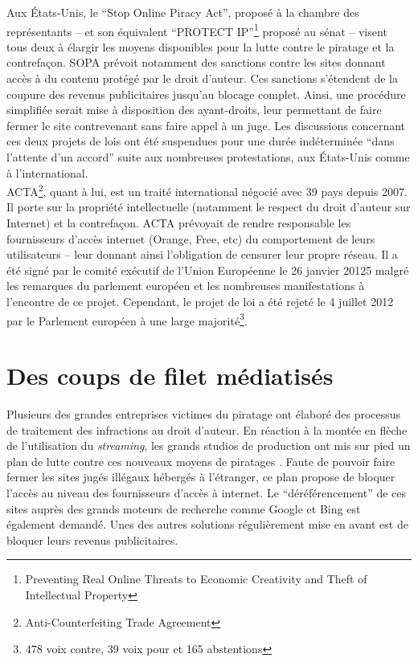 \documentclass[a4paper]{report}
\begin{document}
		Aux États-Unis, le ``Stop Online Piracy Act'', proposé à la chambre des représentants – et son équivalent ``PROTECT IP''\footnote{Preventing Real Online Threats to Economic Creativity and Theft of Intellectual Property} proposé au sénat – visent tous deux à élargir les moyens disponibles pour la lutte contre le piratage et la contrefaçon. SOPA prévoit notamment des sanctions contre les sites donnant accès à du contenu protégé par le droit d'auteur. Ces sanctions s'étendent de la coupure des revenus publicitaires jusqu'au blocage complet. Ainsi, une procédure simplifiée serait mise à disposition des ayant-droits, leur permettant de faire fermer le site contrevenant sans faire appel à un juge. Les discussions concernant ces deux projets de lois ont été suspendues pour une durée indéterminée ``dans l'attente d'un accord'' \cite{suspension-sopa} suite aux nombreuses protestations, aux États-Unis comme à l'international.\\

		ACTA\footnote{Anti-Counterfeiting Trade Agreement}, quant à lui, est un traité international négocié avec 39 pays \cite{no-to-acta} depuis 2007. Il porte sur la propriété intellectuelle (notamment le respect du droit d'auteur sur Internet) et la contrefaçon. ACTA prévoyait de rendre responsable les fournisseurs d'accès internet (Orange, Free, etc) du comportement de leurs utilisateurs – leur donnant ainsi l'obligation de censurer leur propre réseau. Il a été signé par le comité exécutif de l'Union Européenne le 26 janvier 20125 malgré les remarques du parlement européen et les nombreuses manifestations à l'encontre de ce projet. Cependant, le projet de loi a été rejeté le 4 juillet 2012 par le Parlement européen \cite{acta-vote} à une large majorité\footnote{478 voix contre, 39 voix pour et 165 abstentions}.


	\section{Des coups de filet médiatisés}
	Plusieurs des grandes entreprises victimes du piratage ont élaboré des processus de traitement des infractions au droit d'auteur. En réaction à la montée en flèche de l'utilisation du \emph{streaming}, les grands studios de production ont mis sur pied un plan de lutte contre ces nouveaux moyens de piratages \cite{lutte-streaming}. Faute de pouvoir faire fermer les sites jugés illégaux hébergés à l'étranger, ce plan propose de bloquer l'accès au niveau des fournisseurs d'accès à internet. Le ``déréférencement'' de ces sites auprès des grands moteurs de recherche comme Google et Bing est également demandé. Unes des autres solutions régulièrement mise en avant est de bloquer leurs revenus publicitaires.\\
\end{document}
